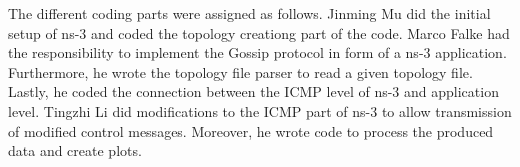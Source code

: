 \documentclass[12pt,journal]{IEEEtran}
\begin{document}
The different coding parts were assigned as follows. Jinming Mu did the initial setup of ns-3 and coded the topology creationg part of the code. Marco Falke had the responsibility to implement the Gossip protocol in form of a ns-3 application. Furthermore, he wrote the topology file parser to read a given topology file. Lastly, he coded the connection between the ICMP level of ns-3 and application level. Tingzhi Li did modifications to the ICMP part of ns-3 to allow transmission of modified control messages. Moreover, he wrote code to process the produced data and create plots.

\end{document}
